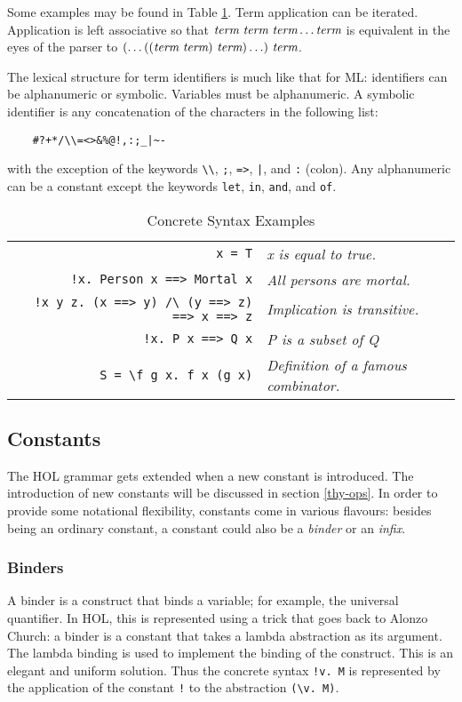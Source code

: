  Some examples may be found in Table \ref{syntaxExamples}. Term
 application can be iterated. Application is left associative so that
 $\mbox{\it term}\ \mbox{\it term}\ \mbox{\it term} \ldots \mbox{\it term}$ is equivalent in the eyes of the
 parser to $(\ldots((\term\ \term)\ \term) \ldots)\ \term$.

The lexical structure for term identifiers is much like that for
ML: identifiers can be alphanumeric or symbolic. Variables must be 
alphanumeric. A symbolic identifier is any concatenation of the characters 
in the following list:
\begin{verbatim}
    #?+*/\\=<>&%@!,:;_|~-
\end{verbatim}
with the exception of the keywords \verb+\\+, \verb+;+, \verb+=>+,
\verb+|+, and \verb+:+ (colon). Any alphanumeric can be a constant except the
keywords \verb+let+, \verb+in+, \verb+and+, and \verb+of+.

 \begin{table}[h]
\begin{center}
 \begin{tabular}{|r|l|} \hline
 \verb+x = T+ & {\it x is equal to true.} \\
 \verb+!x. Person x ==> Mortal x+ & {\it All persons are mortal.} \\
 \verb+!x y z. (x ==> y) /\ (y ==> z) ==> x ==> z+ & {\it Implication is
 transitive.} \\
 \verb+!x. P x ==> Q x+ & {\it P is a subset of Q} \\
 \verb+S = \f g x. f x (g x)+ & {\it Definition of a famous combinator.} \\ \hline
 \end{tabular}
 \caption{Concrete Syntax Examples}\label{syntaxExamples}
\end{center}
 \end{table}


\subsection{Constants}

The HOL grammar gets extended when a new constant is introduced. The
introduction of new constants will be discussed in section
\ref{thy-ops}. In order to provide some notational flexibility,
constants come in various flavours: besides being an ordinary constant,
a constant could also be a {\it binder\/} or an {\it infix}.

\subsubsection{Binders} A binder is a construct that binds a variable;
 for example, the universal quantifier. In HOL, this is represented
 using a trick that goes back to Alonzo Church: a binder is a constant
 that takes a lambda abstraction as its argument. The lambda binding is
 used to implement the binding of the construct. This is an elegant and
 uniform solution. Thus the concrete syntax \verb+!v. M+ is represented
 by the application of the constant \verb+!+ to the abstraction
 \verb+(\v. M)+.

